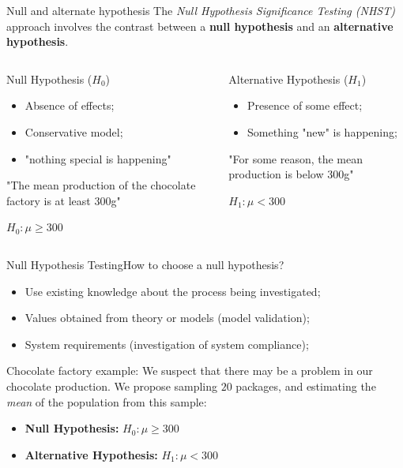 \begin{frame}{Null and alternate hypothesis}
  The \emph{Null Hypothesis Significance Testing (NHST)} approach involves the contrast between a {\bf null hypothesis} and an {\bf alternative hypothesis}.\bigskip

  \begin{columns}
    \begin{block}{Null Hypothesis ($H_0$)}
      \begin{itemize}
        \item Absence of effects;
        \item Conservative model;
        \item "nothing special is happening"
      \end{itemize}
      \bigskip

      "The mean production of the chocolate factory is at least 300g"
      \bigskip

      {\bf $H_0: \mu \geq 300$}
    \end{block}
    \begin{block}{Alternative Hypothesis ($H_1$)}
      \begin{itemize}
        \item Presence of some effect;
        \item Something "new" is happening;
      \end{itemize}
      \bigskip

      "For \alert{some reason}, the mean production is below 300g"
      \bigskip

      {\bf $H_1: \mu < 300$}
    \end{block}
  \end{columns}
\end{frame}

\begin{frame}{Null Hypothesis Testing}{How to choose a null hypothesis?}
  \begin{itemize}
    \item Use existing knowledge about the process being investigated;
    \item Values obtained from theory or models (model validation);
    \item System requirements (investigation of system compliance);
  \end{itemize}
  \bigskip
  \begin{block}{Chocolate factory example:}
    We suspect that there may be a problem in our chocolate production. We propose sampling $20$ packages, and estimating the \emph{mean} of the population from this sample:
    \bigskip
    \begin{itemize}
      \item {\bf Null Hypothesis:} $H_0: \mu \geq 300$
      \item {\bf Alternative Hypothesis:} $H_1: \mu < 300$
    \end{itemize}
  \end{block}
\end{frame}


